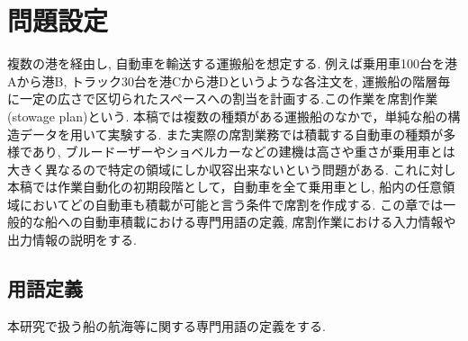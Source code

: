 \chapter{問題設定}\label{definition}

複数の港を経由し, 自動車を輸送する運搬船を想定する. 例えば乗用車100台を港Aから港B, トラック30台を港Cから港Dというような各注文を, 運搬船の階層毎に一定の広さで区切られたスペースへの割当を計画する.この作業を席割作業(stowage plan)\cite{stowage}という. 本稿では複数の種類がある運搬船のなかで，単純な船の構造データを用いて実験する. また実際の席割業務では積載する自動車の種類が多様であり, ブルードーザーやショベルカーなどの建機は高さや重さが乗用車とは大きく異なるので特定の領域にしか収容出来ないという問題がある. これに対し本稿では作業自動化の初期段階として，自動車を全て乗用車とし, 船内の任意領域においてどの自動車も積載が可能と言う条件で席割を作成する. この章では一般的な船への自動車積載における専門用語の定義, 席割作業における入力情報や出力情報の説明をする.

\section{用語定義}
本研究で扱う船の航海等に関する専門用語の定義をする.

